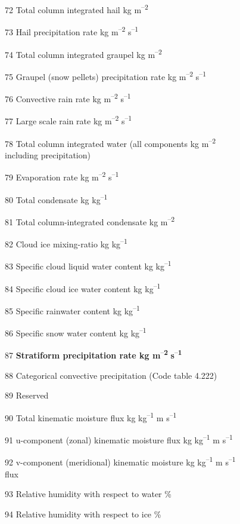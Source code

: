 72 Total column integrated hail kg m\textsuperscript{--2}

73 Hail precipitation rate kg m\textsuperscript{--2} s\textsuperscript{--1}

74 Total column integrated graupel kg m\textsuperscript{--2}

75 Graupel (snow pellets) precipitation rate kg m\textsuperscript{--2} s\textsuperscript{--1}

76 Convective rain rate kg m\textsuperscript{--2} s\textsuperscript{--1}

77 Large scale rain rate kg m\textsuperscript{--2} s\textsuperscript{--1}

78 Total column integrated water (all components kg m\textsuperscript{--2}\\
including precipitation)

79 Evaporation rate kg m\textsuperscript{--2} s\textsuperscript{--1}

80 Total condensate kg kg\textsuperscript{--1}

81 Total column-integrated condensate kg m\textsuperscript{--2}

82 Cloud ice mixing-ratio kg kg\textsuperscript{--1}

83 Specific cloud liquid water content kg kg\textsuperscript{--1}

84 Specific cloud ice water content kg kg\textsuperscript{--1}

85 Specific rainwater content kg kg\textsuperscript{--1}

86 Specific snow water content kg kg\textsuperscript{--1}

87 \textbf{Stratiform precipitation rate kg m}\textsuperscript{--\textbf{2}} \textbf{s}\textsuperscript{--\textbf{1}}

88 Categorical convective precipitation (Code table 4.222)

89 Reserved

90 Total kinematic moisture flux kg kg\textsuperscript{--1} m s\textsuperscript{--1}

91 u-component (zonal) kinematic moisture flux kg kg\textsuperscript{--1} m s\textsuperscript{--1}

92 v-component (meridional) kinematic moisture kg kg\textsuperscript{--1} m s\textsuperscript{--1}\\
flux

93 Relative humidity with respect to water \%

94 Relative humidity with respect to ice \%

